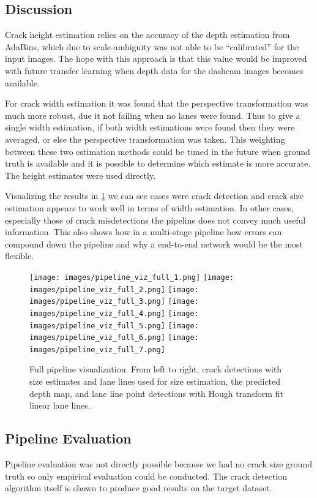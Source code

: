 \documentclass{article}
\begin{document}
\subsection{Discussion}
Crack height estimation relies on the accuracy of the depth estimation from AdaBins, which due to scale-ambiguity was not able to be ``calibrated'' for the input images.
The hope with this approach is that this value would be improved with future transfer learning when depth data for the dashcam images becomes available.

For crack width estimation it was found that the perspective transformation was much more robust, due it not failing when no lanes were found.
Thus to give a single width estimation, if both width estimations were found then they were averaged, or else the perspective transformation was taken. 
This weighting between these two estimation methods could be tuned in the future when ground truth is available and it is possible to determine which estimate is more accurate.
The height estimates were used directly.

Visualizing the results in \ref{fig:pipeline_viz_full} we can see cases were crack detection and crack size estimation appears to work well in terms of width estimation.
In other cases, especially those of crack misdetections the pipeline does not convey much useful information.
This also shows how in a multi-stage pipeline how errors can compound down the pipeline and why a end-to-end network would be the most flexible.

\begin{figure}[ht]
\begin{center}
\texttt{[image: images/pipeline\_viz\_full\_1.png]}
\texttt{[image: images/pipeline\_viz\_full\_2.png]}
\texttt{[image: images/pipeline\_viz\_full\_3.png]}
\texttt{[image: images/pipeline\_viz\_full\_4.png]}
\texttt{[image: images/pipeline\_viz\_full\_5.png]}
\texttt{[image: images/pipeline\_viz\_full\_6.png]}
\texttt{[image: images/pipeline\_viz\_full\_7.png]}
\end{center}
\caption{Full pipeline visualization. From left to right, crack detections with size estimates and lane lines used for size estimation, the predicted depth map, and lane line point detections with Hough transform fit linear lane lines.}
\label{fig:pipeline_viz_full}
\end{figure}

\subsection{Pipeline Evaluation}
Pipeline evaluation was not directly possible because we had no crack size ground truth so only empirical evaluation could be conducted. The crack detection algorithm itself is shown to produce good results on the target dataset.
\end{document}

